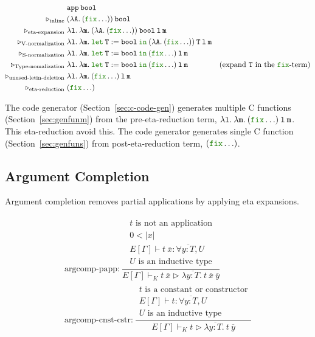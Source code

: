 \documentclass[a4paper,fleqn]{article}
\newcommand{\kwlet}{\mbox{\color{mygreen}\ttfamily let}}
\newcommand{\kwin}{\mbox{\color{mygreen}\ttfamily in}}
\newcommand{\kwfix}{\mbox{\color{mygreen}\ttfamily fix}}
\newcommand{\lam}[2]{\lambda #1.\:#2}
\newcommand{\letin}[3]{\kwlet\:#1:=#2\:\kwin\:#3}
\newcommand{\breakrule}{\\[0.5em]}
\newcommand{\secref}[1]{Section~\ref{#1}}
\newcommand{\reltri}{\mathrel{\triangleright}}
\newcommand{\rep}[1]{\overline{#1}}
\begin{document}
\newcommand{\ttA}{\texttt{A}}
\newcommand{\ttT}{\texttt{T}}
\newcommand{\ttl}{\texttt{l}}
\newcommand{\ttm}{\texttt{m}}
\begin{align*}
  & \texttt{app}\:\texttt{bool} \\
  \reltri_\textrm{inline}\; & (\lam{\ttA}{(\kwfix \ldots)})\:\texttt{bool} \\
  \reltri_\textrm{eta-expansion}\; & \lam{\ttl}{\lam{\ttm}{(\lam{\ttA}{(\kwfix \ldots)})\:\texttt{bool}\:\ttl\:\ttm}} \\
  \reltri_\textrm{V-normalization}\; & \lam{\ttl}{\lam{\ttm}{\letin{\ttT}{\texttt{bool}}{(\lam{\ttA}{(\kwfix \ldots)})\:\ttT\:\ttl\:\ttm}}} \\
  \reltri_\textrm{S-normalization}\; & \lam{\ttl}{\lam{\ttm}{\letin{\ttT}{\texttt{bool}}{(\kwfix \ldots)\:\ttl\:\ttm}}} \\
  \reltri_\textrm{Type-nomalization}\; & \lam{\ttl}{\lam{\ttm}{\letin{\ttT}{\texttt{bool}}{(\kwfix \ldots)\:\ttl\:\ttm}}} & \textrm{(expand $\ttT$ in the \kwfix-term)} \\
  \reltri_\textrm{unused-letin-deletion}\; & \lam{\ttl}{\lam{\ttm}{(\kwfix \ldots)\:\ttl\:\ttm}} \\
  \reltri_\textrm{eta-reduction}\; & (\kwfix \ldots) \\
\end{align*}

The code generator (\secref{sec:c-code-gen}) generates multiple C functions (\secref{sec:genfunm}) from the pre-eta-reduction term, $\lam{\ttl}{\lam{\ttm}{(\kwfix \ldots)\:\ttl\:\ttm}}$.
This eta-reduction avoid this.
The code generator generates single C function (\secref{sec:genfuns}) from post-eta-reduction term, $(\kwfix \ldots)$.

\subsection{Argument Completion}\label{sec:argcomp}
Argument completion removes partial applications by applying eta expansions.

\begin{gather*}
  \text{argcomp-papp:}~
    \dfrac{
      \begin{gathered}
        \text{$t$ is not an application} \\
        0 < |x| \\
        E[\Gamma] \vdash t\:\rep{x} : \forall \rep{y{:}T}, U \\
        \text{$U$ is an inductive type}
      \end{gathered}
    }{E[\Gamma] \vdash_K
        t\:\rep{x}
        \reltri
        \lam{\rep{y{:}T}}{t\:\rep{x}\:\rep{y}}
    } \breakrule
  \text{argcomp-cnst-cstr:}~
    \dfrac{
      \begin{gathered}
        \text{$t$ is a constant or constructor} \\
        E[\Gamma] \vdash t : \forall \rep{y{:}T}, U \\
        \text{$U$ is an inductive type}
      \end{gathered}
    }{E[\Gamma] \vdash_K
        t
        \reltri
        \lam{\rep{y{:}T}}{t\:\rep{y}}
    }
\end{gather*}
\end{document}
